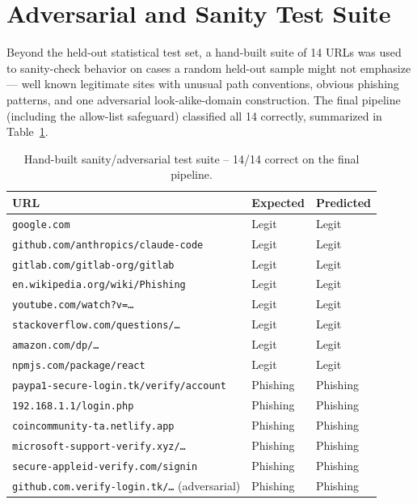 \documentclass[11pt,a4paper]{report}
\begin{document}
\section{Adversarial and Sanity Test Suite}
Beyond the held-out statistical test set, a hand-built suite of 14 URLs was used to
sanity-check behavior on cases a random held-out sample might not emphasize --- well
known legitimate sites with unusual path conventions, obvious phishing patterns, and
one adversarial look-alike-domain construction. The final pipeline (including the
allow-list safeguard) classified all 14 correctly, summarized in
Table~\ref{tab:adversarial}.

\begin{table}[H]
\centering
\small
\begin{tabular}{p{7.9cm}p{1.8cm}p{1.8cm}}
\toprule
\textbf{URL} & \textbf{Expected} & \textbf{Predicted} \\
\midrule
\texttt{google.com} & Legit & Legit \\
\texttt{github.com/anthropics/claude-code} & Legit & Legit \\
\texttt{gitlab.com/gitlab-org/gitlab} & Legit & Legit \\
\texttt{en.wikipedia.org/wiki/Phishing} & Legit & Legit \\
\texttt{youtube.com/watch?v=\ldots} & Legit & Legit \\
\texttt{stackoverflow.com/questions/\ldots} & Legit & Legit \\
\texttt{amazon.com/dp/\ldots} & Legit & Legit \\
\texttt{npmjs.com/package/react} & Legit & Legit \\
\texttt{paypa1-secure-login.tk/verify/account} & Phishing & Phishing \\
\texttt{192.168.1.1/login.php} & Phishing & Phishing \\
\texttt{coincommunity-ta.netlify.app} & Phishing & Phishing \\
\texttt{microsoft-support-verify.xyz/\ldots} & Phishing & Phishing \\
\texttt{secure-appleid-verify.com/signin} & Phishing & Phishing \\
\texttt{github.com.verify-login.tk/\ldots} (adversarial) & Phishing & Phishing \\
\bottomrule
\end{tabular}
\caption{Hand-built sanity/adversarial test suite -- 14/14 correct on the final pipeline.}
\label{tab:adversarial}
\end{table}
\end{document}
